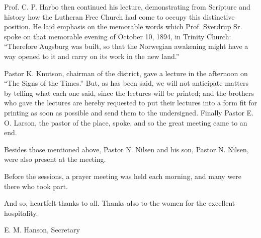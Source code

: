 Prof. C. P. Harbo then continued his lecture, demonstrating from Scripture and history how the Lutheran Free Church had come to occupy this distinctive position. He laid emphasis on the memorable words which Prof. Sverdrup Sr. spoke on that memorable evening of October 10, 1894, in Trinity Church: “Therefore Augsburg was built, so that the Norwegian awakening might have a way opened to it and carry on its work in the new land.”

Pastor K. Knutson, chairman of the district, gave a lecture in the afternoon on “The Signs of the Times.” But, as has been said, we will not anticipate matters by telling what each one said, since the lectures will be printed; and the brothers who gave the lectures are hereby requested to put their lectures into a form fit for printing as soon as possible and send them to the undersigned. Finally Pastor E. O. Larson, the pastor of the place, spoke, and so the great meeting came to an end.

Besides those mentioned above, Pastor N. Nilsen and his son, Pastor N. Nilsen, were also present at the meeting.

Before the sessions, a prayer meeting was held each morning, and many were there who took part.

And so, heartfelt thanks to all. Thanks also to the women for the excellent hospitality.

E. M. Hanson,
Secretary